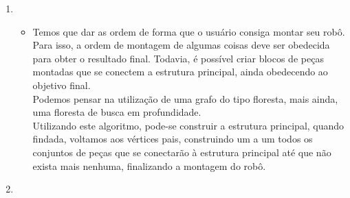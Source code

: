 \documentclass[11pt,reqno]{amsart}
\begin{document}
\begin{enumerate}
		\item

		\begin{itemize}
			\item Temos que dar as ordem de forma que o usuário consiga montar seu robô. Para isso, a ordem de montagem de algumas coisas deve ser obedecida para obter o resultado final. Todavia, é possível criar blocos de peças montadas que se conectem a estrutura principal, ainda obedecendo ao objetivo final. \\ Podemos pensar na utilização de uma grafo do tipo floresta, mais ainda, uma floresta de busca em profundidade. \\ Utilizando este algoritmo, pode-se construir a estrutura principal, quando findada, voltamos aos vértices pais, construindo um a um todos os conjuntos de peças que se conectarão à estrutura principal até que não exista mais nenhuma, finalizando a montagem do robô.
		\end{itemize}
		\vspace{0.4cm}

		\item


\end{enumerate}
\end{document}
